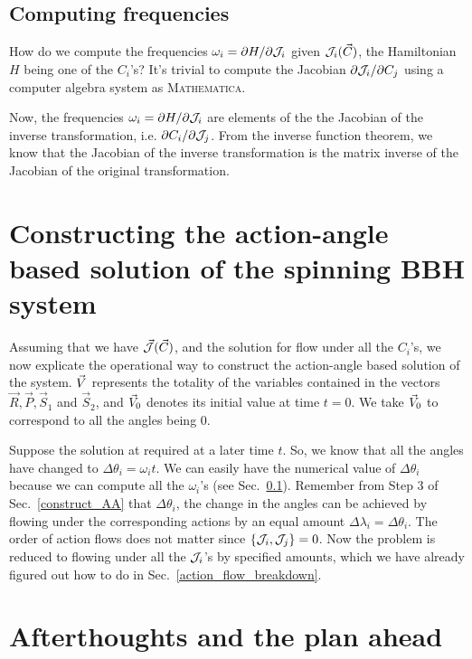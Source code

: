 \subsection{Computing frequencies}    \label{compute_freq}


How do we compute the frequencies $\omega_i = \partial H/\partial \mathcal{J}_i$ given 
$\mathcal{J}_i(\vec{C})$, the Hamiltonian $H$ being one of the $C_i$'s?
It's trivial to compute the Jacobian $\partial \mathcal{J}_i/\partial C_j$ using 
a computer algebra system as \textsc{Mathematica}. 


Now, the frequencies $\omega_i = \partial H/\partial \mathcal{J}_i$ are elements of the 
the Jacobian of the inverse transformation, i.e. 
$\partial C_i/\partial \mathcal{J}_j$. From the inverse function theorem, we know 
that the Jacobian of the inverse transformation is the matrix 
inverse of the Jacobian of the original transformation.




\section{Constructing the action-angle based solution of the spinning BBH system}


Assuming that we have $\vec{\mathcal{J}}(\vec{C})$, and the solution for flow under
all the $C_i$'s, we now explicate the operational way to construct the
action-angle based solution of the system. $\vec{V}$ represents the totality of
the variables contained in the vectors $\vec{R}, \vec{P}, \vec{S}_1$ and $\vec{S}_2$,
and $\vec{V}_0$ denotes its initial value at time $t=0$.
We take $\vec{V}_0$ to correspond to all the angles being 0.


Suppose the solution at required at  a later time $t$. So, we know that
all the angles have changed to $\Delta \theta_i = \omega_i t$. 
We can easily have the numerical value of $\Delta \theta_i$ because we 
can compute all the $\omega_i$'s (see Sec.~\ref{compute_freq}).
Remember from Step 3 of Sec.~\ref{construct_AA}
that $\Delta \theta_i$, the change in the angles can be achieved by flowing 
under the corresponding actions by an equal amount
$\Delta \lambda_i = \Delta \theta_i$. The order of action flows does not matter
since $\left\lbrace \mathcal{J}_i, \mathcal{J}_j \right\rbrace = 0$. Now the problem is reduced to flowing 
under all the $\mathcal{J}_i$'s by specified amounts, which we have
already figured out how to do in Sec.~\ref{action_flow_breakdown}.





\section{Afterthoughts and the plan ahead}



